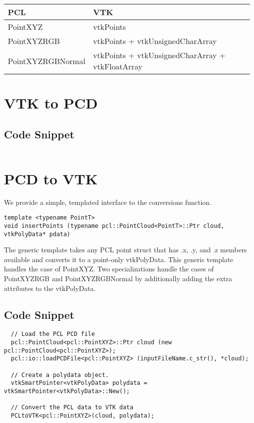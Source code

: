 \documentclass{ComputationalAlgorithmsArticle}
\begin{document}
\begin{center}
 
\begin{tabular}{ l | l }
  PCL & VTK\\
  \hline
  PointXYZ & vtkPoints\\
  PointXYZRGB & vtkPoints + vtkUnsignedCharArray \\
  PointXYZRGBNormal & vtkPoints + vtkUnsignedCharArray + vtkFloatArray\\
\end{tabular}

\end{center}


\section{VTK to PCD}


\subsection{Code Snippet}

\begin{verbatim}
\end{verbatim}

\section{PCD to VTK}
We provide a simple, templated interface to the conversions function.
\begin{verbatim}
template <typename PointT> 
void insertPoints (typename pcl::PointCloud<PointT>::Ptr cloud, vtkPolyData* pdata)
\end{verbatim}

The generic template takes any PCL point struct that has .x, .y, and .z members available and converts it to a point-only vtkPolyData. This generic template handles the case of PointXYZ. Two specializations handle the cases of PointXYZRGB and PointXYZRGBNormal by additionally adding the extra attributes to the vtkPolyData.

\subsection{Code Snippet}

\begin{verbatim}
  // Load the PCL PCD file
  pcl::PointCloud<pcl::PointXYZ>::Ptr cloud (new pcl::PointCloud<pcl::PointXYZ>);
  pcl::io::loadPCDFile<pcl::PointXYZ> (inputFileName.c_str(), *cloud);

  // Create a polydata object.
  vtkSmartPointer<vtkPolyData> polydata = vtkSmartPointer<vtkPolyData>::New();

  // Convert the PCL data to VTK data
  PCLtoVTK<pcl::PointXYZ>(cloud, polydata);
\end{verbatim}
\end{document}
